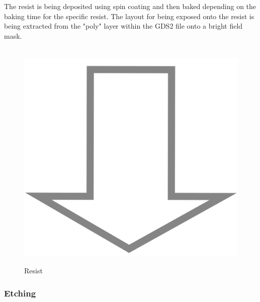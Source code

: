 The resist is being deposited using spin coating and then baked depending on the baking time for the specific resist.
The layout for being exposed onto the resist is being extracted from the "poly" layer within the GDS2 file onto a bright field mask.

\begin{figure}[H]
	\centering
	\begin{tikzpicture}[node distance = 3cm, auto, thick,scale=\CrossSectionOnly, every node/.style={transform shape}]
		
	\end{tikzpicture} \\
	\includegraphics[scale=0.01]{down_arrow.png} \\
	\begin{tikzpicture}[node distance = 3cm, auto, thick,scale=\CrossSectionOnly, every node/.style={transform shape}]
		
	\end{tikzpicture}
	\caption{Resist}
\end{figure}

\subsubsection{Etching}

